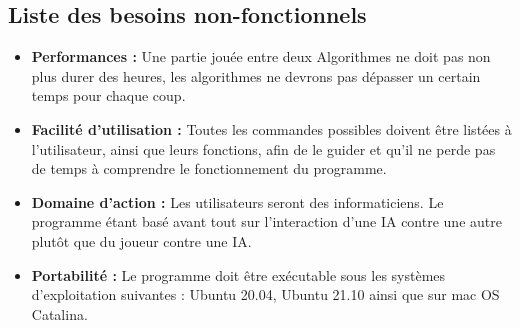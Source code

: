 \documentclass{article}
\begin{document}
\subsection{Liste des besoins non-fonctionnels}
\medskip
\begin{itemize}
    
    \item \textbf{Performances : }
    Une partie jouée entre deux Algorithmes ne doit pas non plus durer des heures, les algorithmes ne devrons pas dépasser un certain temps pour chaque coup.
    \newline
    \item \textbf{Facilité d'utilisation : } 
    Toutes les commandes possibles doivent être listées à l'utilisateur, ainsi que leurs fonctions, afin de le guider et qu'il ne perde pas de temps à comprendre le fonctionnement du programme.
    \newline
    \item \textbf{Domaine d'action : } 
    Les utilisateurs seront des informaticiens. Le programme étant basé avant tout sur l'interaction d'une IA contre une autre plutôt que du joueur contre une IA.
    \newline
    \item \textbf{Portabilité : } 
    \newline
    Le programme doit être exécutable sous les systèmes d'exploitation suivantes : Ubuntu 20.04, Ubuntu 21.10 ainsi que sur mac OS Catalina.
    \newline
    
\end{itemize}
\medskip
\end{document}
